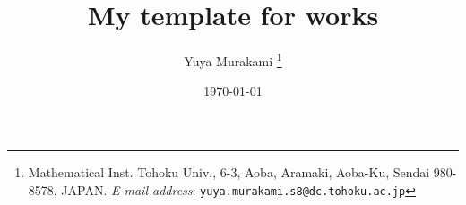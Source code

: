 \documentclass[11pt,a4paper,oneside,lualatex]{article}
\begin{document}

\title{My template for works}
\author{Yuya Murakami
\thanks{Mathematical Inst. Tohoku Univ., 6-3, Aoba, Aramaki, Aoba-Ku, Sendai 980-8578, JAPAN.
	\textit{E-mail address}: \texttt{yuya.murakami.s8@dc.tohoku.ac.jp}}}
\date{\today}

\maketitle

\tableofcontents


%
%

\end{document}
